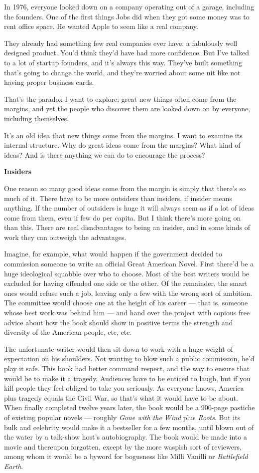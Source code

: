 In 1976, everyone looked down on a company operating out of a garage,
including the founders. One of the first things Jobs did when they got
some money was to rent office space. He wanted Apple to seem like a real
company.

They already had something few real companies ever have: a fabulously
well designed product. You'd think they'd have had more confidence. But
I've talked to a lot of startup founders, and it's always this way.
They've built something that's going to change the world, and they're
worried about some nit like not having proper business cards.

That's the paradox I want to explore: great new things often come from
the margins, and yet the people who discover them are looked down on by
everyone, including themselves.

It's an old idea that new things come from the margins. I want to
examine its internal structure. Why do great ideas come from the
margins? What kind of ideas? And is there anything we can do to
encourage the process?

\textbf{Insiders}

One reason so many good ideas come from the margin is simply that
there's so much of it. There have to be more outsiders than insiders, if
insider means anything. If the number of outsiders is huge it will
always seem as if a lot of ideas come from them, even if few do per
capita. But I think there's more going on than this. There are real
disadvantages to being an insider, and in some kinds of work they can
outweigh the advantages.

Imagine, for example, what would happen if the government decided to
commission someone to write an official Great American Novel. First
there'd be a huge ideological squabble over who to choose. Most of the
best writers would be excluded for having offended one side or the
other. Of the remainder, the smart ones would refuse such a job, leaving
only a few with the wrong sort of ambition. The committee would choose
one at the height of his career --- that is, someone whose best work was
behind him --- and hand over the project with copious free advice about
how the book should show in positive terms the strength and diversity of
the American people, etc, etc.

The unfortunate writer would then sit down to work with a huge weight of
expectation on his shoulders. Not wanting to blow such a public
commission, he'd play it safe. This book had better command respect, and
the way to ensure that would be to make it a tragedy. Audiences have to
be enticed to laugh, but if you kill people they feel obliged to take
you seriously. As everyone knows, America plus tragedy equals the Civil
War, so that's what it would have to be about. When finally completed
twelve years later, the book would be a 900-page pastiche of existing
popular novels --- roughly \emph{Gone with the Wind} plus \emph{Roots}.
But its bulk and celebrity would make it a bestseller for a few months,
until blown out of the water by a talk-show host's autobiography. The
book would be made into a movie and thereupon forgotten, except by the
more waspish sort of reviewers, among whom it would be a byword for
bogusness like Milli Vanilli or \emph{Battlefield Earth}.

